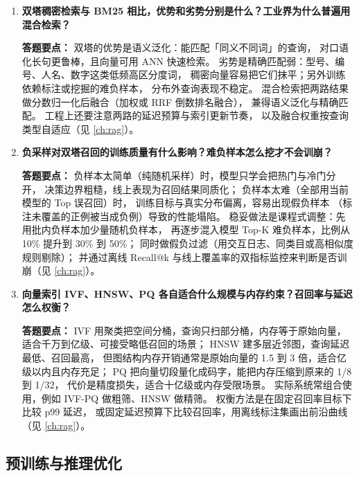 \begin{interview}[题库与答题要点]
\begin{enumerate}[label=]
  \item[\textcolor{VioletDeep}{\textbf{Q47.}}] \textbf{双塔稠密检索与 BM25 相比，优势和劣势分别是什么？工业界为什么普遍用混合检索？}
\par\smallskip\noindent\textcolor{VioletDeep}{\textbf{答题要点：}}
双塔的优势是语义泛化：能匹配「同义不同词」的查询，
对口语化长句更鲁棒，且向量可用 ANN 快速检索。
劣势是精确匹配弱：型号、编号、人名、数字这类低频高区分度词，
稠密向量容易把它们抹平；另外训练依赖标注或挖掘的难负样本，
分布外查询表现不稳定。
混合检索把两路结果做分数归一化后融合（加权或 RRF 倒数排名融合），
兼得语义泛化与精确匹配。
工程上还要注意两路的延迟预算与索引更新节奏，
以及融合权重按查询类型自适应（见 \cref{ch:rag}）。

  \item[\textcolor{VioletDeep}{\textbf{Q48.}}] \textbf{负采样对双塔召回的训练质量有什么影响？难负样本怎么挖才不会训崩？}
\par\smallskip\noindent\textcolor{VioletDeep}{\textbf{答题要点：}}
负样本太简单（纯随机采样）时，模型只学会把热门与冷门分开，
决策边界粗糙，线上表现为召回结果同质化；
负样本太难（全部用当前模型的 Top 误召回）时，
训练目标与真实分布偏离，容易出现假负样本
（标注未覆盖的正例被当成负例）导致的性能塌陷。
稳妥做法是课程式调整：先用批内负样本加少量随机负样本，
再逐步混入模型 Top-K 难负样本，比例从 10\% 提升到 30\% 到 50\%；
同时做假负过滤（用交互日志、同类目或高相似度规则剔除）；
并通过离线 Recall@k 与线上覆盖率的双指标监控来判断是否训崩（见 \cref{ch:rag}）。

  \item[\textcolor{VioletDeep}{\textbf{Q49.}}] \textbf{向量索引 IVF、HNSW、PQ 各自适合什么规模与内存约束？召回率与延迟怎么权衡？}
\par\smallskip\noindent\textcolor{VioletDeep}{\textbf{答题要点：}}
IVF 用聚类把空间分桶，查询只扫部分桶，内存等于原始向量，
适合千万到亿级、可接受略低召回的场景；
HNSW 建多层近邻图，查询延迟最低、召回最高，
但图结构内存开销通常是原始向量的 1.5 到 3 倍，适合亿级以内且内存充足；
PQ 把向量切段量化成码字，能把内存压缩到原来的 1/8 到 1/32，
代价是精度损失，适合十亿级或内存受限场景。
实际系统常组合使用，例如 IVF-PQ 做粗筛、HNSW 做精筛。
权衡方法是在固定召回率目标下比较 p99 延迟，
或固定延迟预算下比较召回率，用离线标注集画出前沿曲线（见 \cref{ch:rag}）。

\end{enumerate}

\end{interview}

\subsection{预训练与推理优化}

